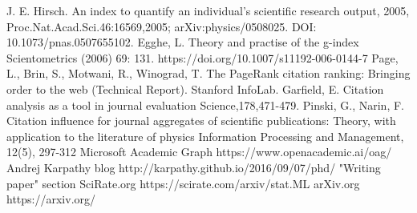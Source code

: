 \documentclass[a4paper, 11pt]{article}
\begin{document}
\begin{thebibliography}{9}
J. E. Hirsch.
\newblock An index to quantify an individual's scientific research output, 2005,
\newblock Proc.Nat.Acad.Sci.46:16569,2005;
\newblock arXiv:physics/0508025.
\newblock DOI: 10.1073/pnas.0507655102.
Egghe, L.
\newblock  Theory and practise of the g-index
\newblock Scientometrics (2006) 69: 131.
\newblock https://doi.org/10.1007/s11192-006-0144-7
Page, L., Brin, S., Motwani, R., Winograd, T. 
\newblock  The PageRank citation ranking: Bringing order to the web  
\newblock  (Technical Report). Stanford InfoLab.
Garfield, E.
\newblock  Citation analysis as a tool in journal evaluation
\newblock Science,178,471-479.
Pinski, G.,  Narin, F. 
\newblock Citation influence for journal aggregates of scientific publications: Theory, with application to the literature of physics
\newblock  Information Processing and Management, 12(5), 297-312
Microsoft Academic Graph 
\newblock https://www.openacademic.ai/oag/
Andrej Karpathy blog
\newblock http://karpathy.github.io/2016/09/07/phd/
\newblock "Writing paper" section
SciRate.org
\newblock  https://scirate.com/arxiv/stat.ML
arXiv.org
\newblock  https://arxiv.org/

\end{thebibliography}

\listoffigures
\end{document}
